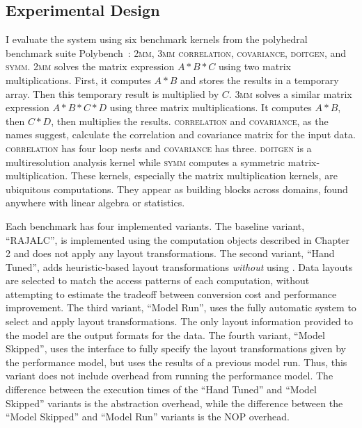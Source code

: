 \subsection{Experimental Design}

I evaluate the \FormatDecisions{} system using six benchmark kernels from the polyhedral benchmark suite Polybench~\cite{pouchet2012polybench}: \textsc{2mm}, \textsc{3mm} \textsc{correlation}, \textsc{covariance}, \textsc{doitgen}, and \textsc{symm}.
\textsc{2mm} solves the matrix expression $A*B*C$ using two matrix multiplications. 
First, it computes $A*B$ and stores the results in a temporary array.
Then this temporary result is multiplied by $C$.
\textsc{3mm} solves a similar matrix expression $A*B*C*D$ using three matrix multiplications.
It computes $A*B$, then $C*D$, then multiplies the results.
\textsc{correlation} and \textsc{covariance}, as the names suggest, calculate the correlation and covariance matrix for the input data. 
\textsc{correlation} has four loop nests and \textsc{covariance} has three.
\textsc{doitgen} is a multiresolution analysis kernel while \textsc{symm} computes a symmetric matrix-multiplication.
These kernels, especially the matrix multiplication kernels, are ubiquitous computations.
They appear as building blocks across domains, found anywhere with linear algebra or statistics.

Each benchmark has four implemented variants. 
The baseline variant, ``RAJALC'', is implemented using the computation objects described in Chapter 2 and does not apply any layout transformations.
The second variant, ``Hand Tuned'', adds heuristic-based layout transformations \textit{without} using \FormatDecisions{}.
Data layouts are selected to match the access patterns of each computation, without attempting to estimate the tradeoff between conversion cost and performance improvement.
The third variant, ``Model Run'', uses the fully automatic \FormatDecisions{} system to select and apply layout transformations.
The only layout information provided to the model are the output formats for the data.
The fourth variant, ``Model Skipped'', uses the \FormatDecisions{} interface to fully specify the layout transformations given by the performance model, but uses the results of a previous model run.
Thus, this variant does not include overhead from running the performance model.
The difference between the execution times of the ``Hand Tuned'' and ``Model Skipped'' variants is the abstraction overhead, while the difference between the ``Model Skipped'' and ``Model Run'' variants is the NOP overhead.


